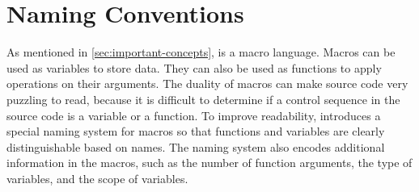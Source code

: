 \documentclass{ltugboat}
\begin{document}


\section{\LTT{} Naming Conventions}

As mentioned in \cref{sec:important-concepts}, \LT{} is a macro language.
Macros can be used as variables to store data.
They can also be used as functions to apply operations on their arguments.
The duality of macros can make \LT{} source code very puzzling to read, because it is difficult to determine if a control sequence in the source code is a variable or a function.
To improve readability, \LT{} introduces a special naming system for macros so that functions and variables are clearly distinguishable based on names. 
The naming system also encodes additional information in the macros, such as the number of function arguments, the type of variables, and the scope of variables. 

\end{document}
